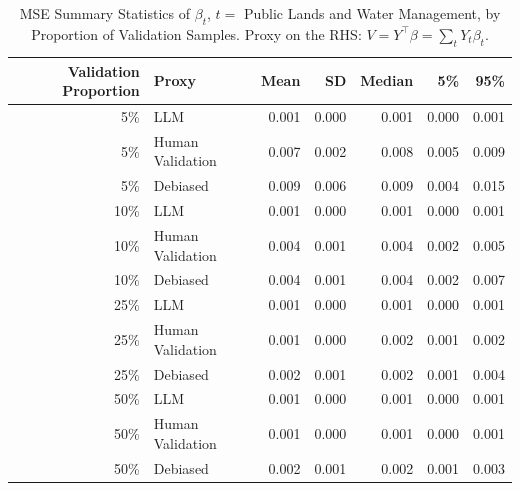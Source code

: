 \begin{table}

\caption{MSE Summary Statistics of $\beta_{t}$, $t=$ Public Lands and Water Management, by Proportion of Validation Samples.
      Proxy on the RHS: $V = Y^\top \beta = \sum_{t} Y_t \beta_t$.}
\centering
\begin{tabular}[t]{rlrrrrr}
\toprule
Validation Proportion & Proxy & Mean & SD & Median & 5\% & 95\%\\
\midrule
5\% & LLM & 0.001 & 0.000 & 0.001 & 0.000 & 0.001\\
5\% & Human Validation & 0.007 & 0.002 & 0.008 & 0.005 & 0.009\\
5\% & Debiased & 0.009 & 0.006 & 0.009 & 0.004 & 0.015\\
10\% & LLM & 0.001 & 0.000 & 0.001 & 0.000 & 0.001\\
10\% & Human Validation & 0.004 & 0.001 & 0.004 & 0.002 & 0.005\\
10\% & Debiased & 0.004 & 0.001 & 0.004 & 0.002 & 0.007\\
25\% & LLM & 0.001 & 0.000 & 0.001 & 0.000 & 0.001\\
25\% & Human Validation & 0.001 & 0.000 & 0.002 & 0.001 & 0.002\\
25\% & Debiased & 0.002 & 0.001 & 0.002 & 0.001 & 0.004\\
50\% & LLM & 0.001 & 0.000 & 0.001 & 0.000 & 0.001\\
50\% & Human Validation & 0.001 & 0.000 & 0.001 & 0.000 & 0.001\\
50\% & Debiased & 0.002 & 0.001 & 0.002 & 0.001 & 0.003\\
\bottomrule
\end{tabular}
\end{table}
